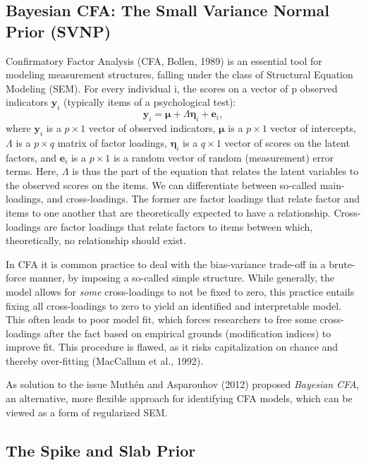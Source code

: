 \documentclass[
  man, donotrepeattitle,floatsintext]{apa6}
\begin{document}
\hypertarget{bayesian-cfa-the-small-variance-normal-prior-svnp}{%
\subsection{Bayesian CFA: The Small Variance Normal Prior (SVNP)}\label{bayesian-cfa-the-small-variance-normal-prior-svnp}}

Confirmatory Factor Analysis (CFA, Bollen, 1989) is an essential tool for modeling measurement structures, falling under the class of Structural Equation Modeling (SEM). For every individual i, the scores on a vector of p observed indicators \(\mathbf{y}_i\) (typically items of a psychological test):
\[\boldsymbol{y}_i = \boldsymbol{\mu} + \Lambda \boldsymbol{\eta}_i + \boldsymbol{e}_i ,\]
where \(\boldsymbol{y}_i\) is a \(p \times 1\) vector of observed indicators, \(\boldsymbol{\mu}\) is a \(p \times 1\) vector of intercepts, \(\Lambda\) is a \(p \times q\) matrix of factor loadings, \(\boldsymbol{\eta}_i\) is a \(q \times 1\) vector of scores on the latent factors, and \(\boldsymbol{e}_i\) is a \(p \times 1\) is a random vector of random (measurement) error terms. Here, \(\Lambda\) is thus the part of the equation that relates the latent variables to the observed scores on the items. We can differentiate between so-called main-loadings, and cross-loadings. The former are factor loadings that relate factor and items to one another that are theoretically expected to have a relationship. Cross-loadings are factor loadings that relate factors to items between which, theoretically, no relationship should exist.

In CFA it is common practice to deal with the bias-variance trade-off in a brute-force manner, by imposing a so-called simple structure. While generally, the model allows for \emph{some} cross-loadings to not be fixed to zero, this practice entails fixing all cross-loadings to zero to yield an identified and interpretable model. This often leads to poor model fit, which forces researchers to free some cross-loadings after the fact based on empirical grounds (modification indices) to improve fit. This procedure is flawed, as it risks capitalization on chance and thereby over-fitting (MacCallum et al., 1992).

As solution to the issue Muthén and Asparouhov (2012) proposed \emph{Bayesian CFA}, an alternative, more flexible approach for identifying CFA models, which can be viewed as a form of regularized SEM.

\hypertarget{the-spike-and-slab-prior}{%
\subsection{The Spike and Slab Prior}\label{the-spike-and-slab-prior}}
\end{document}

